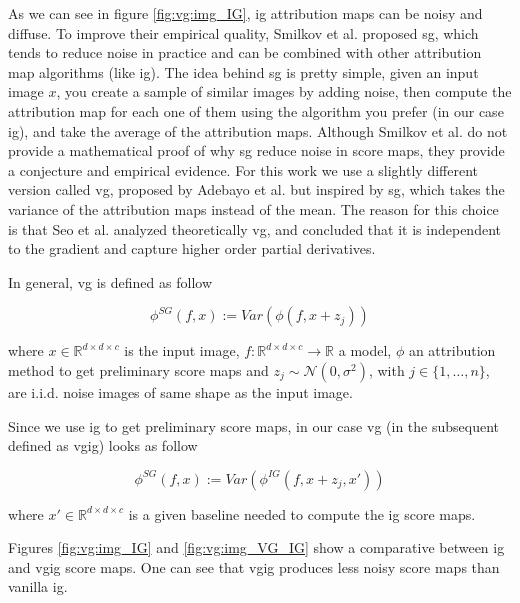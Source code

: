 \graphicspath{{./Sections/Basics/Resources/}}
\glsresetall

As we can see in figure \ref{fig:vg:img_IG}, \gls{ig} attribution maps can be noisy and diffuse. To improve their empirical quality, Smilkov et al. \cite{Smilkov_smoothgrad} proposed \gls{sg}, which tends to reduce noise in practice and can be combined with other attribution map algorithms (like \gls{ig}). The idea behind \gls{sg} is pretty simple, given an input image $x$, you create a sample of similar images by adding noise, then compute the attribution map for each one of them using the algorithm you prefer (in our case \gls{ig}), and take the average of the attribution maps.
Although Smilkov et al. do not provide a mathematical proof of why \gls{sg} reduce noise in score maps, they provide a conjecture and empirical evidence.
For this work we use a slightly different version called \gls{vg}, proposed by Adebayo et al. \cite{adebayo2018local} but inspired by \gls{sg}, which takes the variance of the attribution maps instead of the mean. The reason for this choice is that Seo et al. \cite{Seo_noise} analyzed theoretically \gls{vg}, and concluded that it is independent to the gradient and capture higher order partial derivatives.

In general, \gls{vg} is defined as follow

\begin{equation}
  \phi^{SG}(f, x) := Var(\phi(f, x + z_j))
\end{equation}

\noindent where $x \in \mathbb{R}^{d \times d \times c}$ is the input image, $f:\mathbb{R}^{d \times d \times c} \rightarrow \mathbb{R}$ a model, $\phi$ an attribution method to get preliminary score maps and $z_j \sim \mathcal{N}(0, \sigma^2)$, with $j\in\{1, \dots, n\}$, are i.i.d. noise images of same shape as the input image.

Since we use \gls{ig} to get preliminary score maps, in our case \gls{vg} (in the subsequent defined as \gls{vgig}) looks as follow

\begin{equation}
  \phi^{SG}(f, x) := Var(\phi^{IG}(f, x + z_j, x'))
\end{equation}

\noindent where $x' \in \mathbb{R}^{d \times d \times c}$ is a given baseline needed to compute the \gls{ig} score maps.

Figures \ref{fig:vg:img_IG} and \ref{fig:vg:img_VG_IG} show a comparative between \gls{ig} and \gls{vgig} score maps. One can see that \gls{vgig} produces less noisy score maps than vanilla \gls{ig}.

